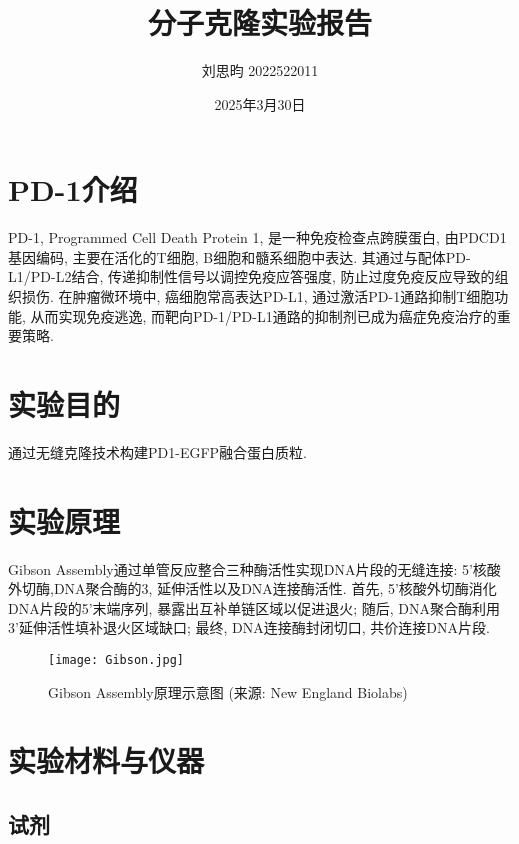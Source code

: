 \documentclass{article}
\title{分子克隆实验报告}
\author{刘思昀 2022522011}
\date{2025年3月30日}
\begin{document}
\maketitle

\section{PD-1介绍}

PD-1, Programmed Cell Death Protein 1, 是一种免疫检查点跨膜蛋白, 由PDCD1基因编码, 主要在活化的T细胞, B细胞和髓系细胞中表达. 其通过与配体PD-L1/PD-L2结合, 传递抑制性信号以调控免疫应答强度, 防止过度免疫反应导致的组织损伤. 在肿瘤微环境中, 癌细胞常高表达PD-L1, 通过激活PD-1通路抑制T细胞功能, 从而实现免疫逃逸, 而靶向PD-1/PD-L1通路的抑制剂已成为癌症免疫治疗的重要策略.

\section{实验目的}

通过无缝克隆技术构建PD1-EGFP融合蛋白质粒.

\section{实验原理}

Gibson Assembly通过单管反应整合三种酶活性实现DNA片段的无缝连接: 5'核酸外切酶,DNA聚合酶的3, 延伸活性以及DNA连接酶活性. 首先, 5'核酸外切酶消化DNA片段的5'末端序列, 暴露出互补单链区域以促进退火; 随后, DNA聚合酶利用3'延伸活性填补退火区域缺口; 最终, DNA连接酶封闭切口, 共价连接DNA片段.

\begin{figure}[htbp]
    \centering
    \texttt{[image: Gibson.jpg]}
    \caption{Gibson Assembly原理示意图 (来源: New England Biolabs)}
    \label{fig:gibson_assembly}
\end{figure}

\newpage

\section{实验材料与仪器}

\subsection{试剂}
\end{document}

